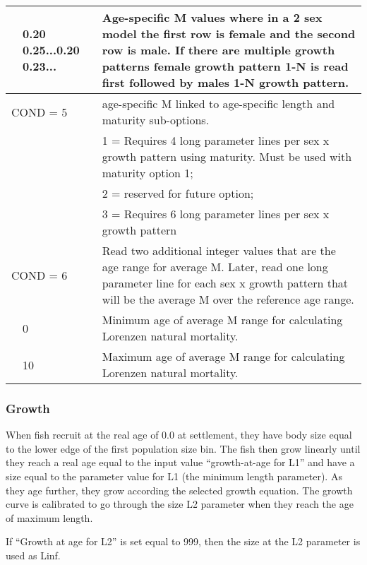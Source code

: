 \begin{longtable}{p{0.5cm} p{2cm} p{12.75cm}}
	& 0.20 0.25...0.20 0.23... & Age-specific M values where in a 2 sex model the first row is female and the second row is male. If there are multiple growth patterns female growth pattern 1-N is read first followed by males 1-N growth pattern. \Bstrut\\
	\hline
	
	\multicolumn{2}{l}{COND = 5} \Tstrut & age-specific M linked to age-specific length and maturity sub-options. \\

	&  & 1 = Requires 4 long parameter lines per sex x growth pattern using maturity. Must be used with maturity option 1; \\
	&  & 2 = reserved for future option; \\
	&  & 3 = Requires 6 long parameter lines per sex x growth pattern \Bstrut\\
	\hline

	\multicolumn{2}{l}{COND = 6} \Tstrut & Read two additional integer values that are the age range for average M. Later, read one long parameter line for each sex x growth pattern that will be the average M over the reference age range. \\
	& 0 \Tstrut & Minimum age of average M range for calculating Lorenzen natural mortality. \\
	& 10 \Tstrut & Maximum age of average M range for calculating Lorenzen natural mortality. \\ 
	\hline
\end{longtable}

\subsubsection{Growth}

When fish recruit at the real age of 0.0 at settlement, they have body size equal to the lower edge of the first population size bin. The fish then grow linearly until they reach a real age equal to the input value ``growth-at-age for L1'' and have a size equal to the parameter value for L1 (the minimum length parameter). As they age further, they grow according the selected growth equation. The growth curve is calibrated to go through the size L2 parameter when they reach the age of maximum length.
	
If ``Growth at age for L2'' is set equal to 999, then the size at the L2 parameter is used as Linf. 
	

